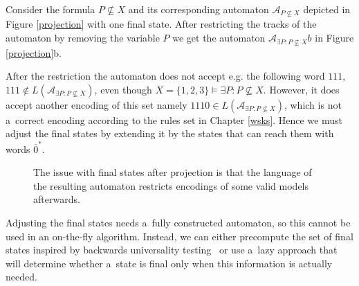 \noindent\hrulefill
\begin{example}
 Consider the formula $P \not\subseteq X$ and its corresponding automaton
 $\mathcal{A}_{P \not\subseteq X}$ depicted in Figure \ref{projection} with
 one final state.
 After restricting the tracks of the automaton by removing the variable $P$ we
 get the automaton $\mathcal{A}_{\exists P: P \not\subseteq X}b$ in Figure
 \ref{projection}b.
 
 After the restriction the automaton does not accept e.g. the following word
 $111$, $111 \notin L(\mathcal{A}_{\exists P: P \not\subseteq X})$, even though $X = \{1, 2,
 3\} \models \exists P: P \not\subseteq X$. However, it does accept another
 encoding of this set namely $1110 \in L(\mathcal{A}_{\exists P: P \not\subseteq
 X})$, which is not a~correct encoding according to the rules set in Chapter
 \ref{wsks}. Hence we must adjust the final states by extending it by the states
 that can reach them with words $\overline{0}^*$.
 \begin{figure}[h!]
  \begin{center}
  \end{center}
  \caption{The issue with final states after projection is that
  the language of the resulting automaton restricts encodings
  of some valid models afterwards.}\label{projection}\label{models}
 \end{figure}\end{example}\noindent\hrulefill

Adjusting the final states needs a~fully constructed automaton, so this cannot
be used in an on-the-fly algorithm. Instead, we can either precompute the set of
final states inspired by backwards universality
testing~\cite{backwards-universality} or use a~lazy approach that will determine
whether a~state is final only when this information is actually needed.

